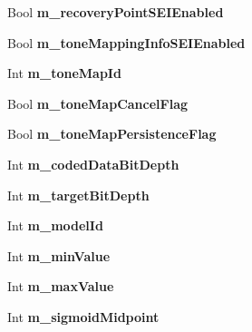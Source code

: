 \begin{DoxyCompactItemize}
\item 
\mbox{\label{class_t_enc_cfg_a01dfffa17d327e626c88aff592408741}} 
Bool {\bfseries m\+\_\+recovery\+Point\+S\+E\+I\+Enabled}
\item 
\mbox{\label{class_t_enc_cfg_a40f7b48bd40ad92de62d216ea5e07d0b}} 
Bool {\bfseries m\+\_\+tone\+Mapping\+Info\+S\+E\+I\+Enabled}
\item 
\mbox{\label{class_t_enc_cfg_afd0d38ef81a1848477187e4360e1f6c9}} 
Int {\bfseries m\+\_\+tone\+Map\+Id}
\item 
\mbox{\label{class_t_enc_cfg_a20f2e73de369fbef2f24b03ea2254bee}} 
Bool {\bfseries m\+\_\+tone\+Map\+Cancel\+Flag}
\item 
\mbox{\label{class_t_enc_cfg_a5cd25ebe1962d79be2858d73adc76823}} 
Bool {\bfseries m\+\_\+tone\+Map\+Persistence\+Flag}
\item 
\mbox{\label{class_t_enc_cfg_a83af0603b0cb9471d9915fe0cc899cf0}} 
Int {\bfseries m\+\_\+coded\+Data\+Bit\+Depth}
\item 
\mbox{\label{class_t_enc_cfg_a87d2b64ece309e1723cc5b167d662585}} 
Int {\bfseries m\+\_\+target\+Bit\+Depth}
\item 
\mbox{\label{class_t_enc_cfg_a9bdfa6a58ce9550be1c46c8d7921a30d}} 
Int {\bfseries m\+\_\+model\+Id}
\item 
\mbox{\label{class_t_enc_cfg_a4c0159f68d49089d8a69388d8017f486}} 
Int {\bfseries m\+\_\+min\+Value}
\item 
\mbox{\label{class_t_enc_cfg_ac06104fd0f7a0e9700b2a138274e429b}} 
Int {\bfseries m\+\_\+max\+Value}
\item 
\mbox{\label{class_t_enc_cfg_a273a0494acfcf27e459383e2be2a6dc1}} 
Int {\bfseries m\+\_\+sigmoid\+Midpoint}
\item 
\mbox{\label{class_t_enc_cfg_a944438672b5e9d5f8e35503d544e73d1}} 

\end{DoxyCompactItemize}
